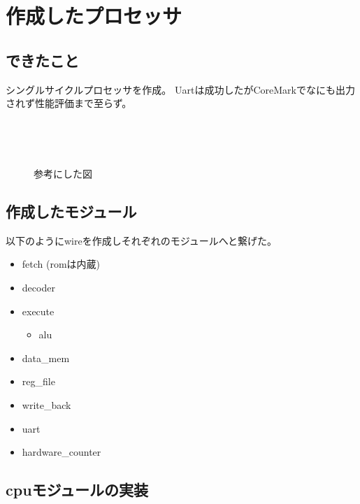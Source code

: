 \documentclass[a4paper,11pt]{jsarticle}
\begin{document}

\newpage


\section{作成したプロセッサ}
\subsection{できたこと}
シングルサイクルプロセッサを作成。
Uartは成功したがCoreMarkでなにも出力されず性能評価まで至らず。

\begin{figure}[H]
 \centering{}
　\caption{参考にした図}
　\label{fig:}
\end{figure}


\subsection{作成したモジュール}
以下のようにwireを作成しそれぞれのモジュールへと繋げた。
\begin{itemize}
  \item fetch (romは内蔵)
  \item decoder
  \item execute
  \begin{itemize}
    \item alu
  \end{itemize}
  \item data\_mem
  \item reg\_file
  \item write\_back
  \item uart
  \item hardware\_counter
\end{itemize}

\subsection{cpuモジュールの実装}
\end{document}
